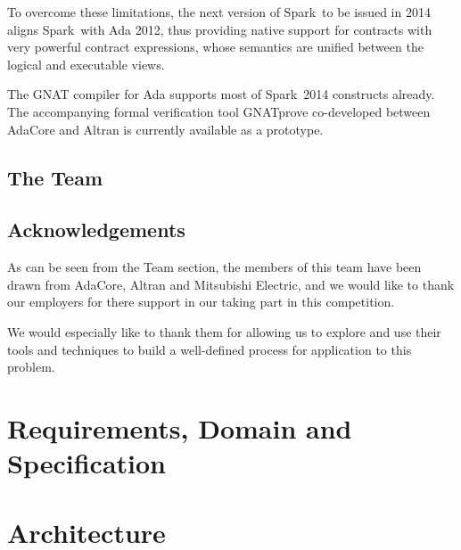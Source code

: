 \documentclass{report}
\newcommand{\mustDo}[1]{\todo[color=red!40]{MUST: #1}}
\newcommand{\spark}[0]{{\sc Spark}}
\begin{document}
To overcome these limitations, the next version of \spark\ to be
issued in 2014 aligns \spark\ with Ada 2012, thus providing native
support for contracts with very powerful contract expressions, whose
semantics are unified between the logical and executable views.

The GNAT compiler for Ada supports most of \spark\ 2014 constructs
already.  The accompanying formal verification tool GNATprove
co-developed between AdaCore and Altran is currently available as a
prototype.

\section{The Team}


\section{Acknowledgements}
As can be seen from the Team section, the members of this team have
been drawn from AdaCore, Altran and Mitsubishi Electric, and we would
like to thank our employers for there support in our taking part in
this competition.

We would especially like to thank them for allowing us to explore and
use their tools and techniques to build a well-defined process for
application to this problem.




\chapter{Requirements, Domain and Specification}
\mustDo{Context Diagram}





\chapter{Architecture}


\end{document}
